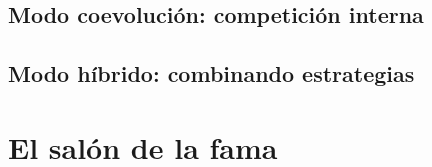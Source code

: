 \subsection{Modo coevolución: competición interna} \label{sec:modo_coevolucion_competicion}


\subsection{Modo híbrido: combinando estrategias} \label{sec:modo_hibrido_combinando}


\section{El salón de la fama} \label{sec:salon_fama}
